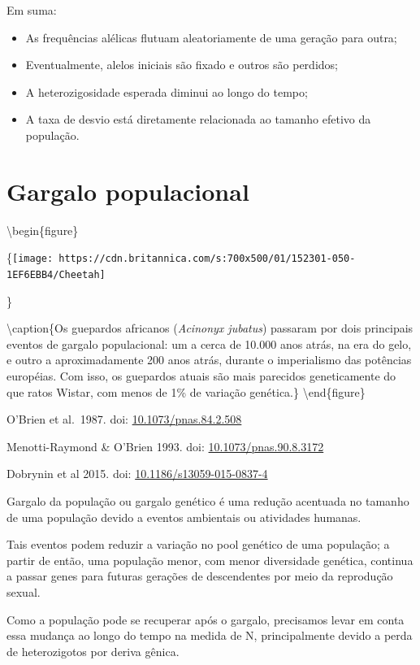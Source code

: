 \documentclass[
]{book}
\begin{document}
Em suma:

\begin{itemize}
\item
  As frequências alélicas flutuam aleatoriamente de uma geração para outra;
\item
  Eventualmente, alelos iniciais são fixado e outros são perdidos;
\item
  A heterozigosidade esperada diminui ao longo do tempo;
\item
  A taxa de desvio está diretamente relacionada ao tamanho efetivo da população.
\end{itemize}

\hypertarget{gargalo-populacional}{%
\section{Gargalo populacional}\label{gargalo-populacional}}

\textbackslash begin\{figure\}

\{\centering \texttt{[image: https://cdn.britannica.com/s:700x500/01/152301-050-1EF6EBB4/Cheetah]}

\}

\textbackslash caption\{Os guepardos africanos (\emph{Acinonyx jubatus}) passaram por dois principais eventos de gargalo populacional: um a cerca de 10.000 anos atrás, na era do gelo, e outro a aproximadamente 200 anos atrás, durante o imperialismo das potências européias. Com isso, os guepardos atuais são mais parecidos geneticamente do que ratos Wistar, com menos de 1\% de variação genética.\}\label{fig:cheetah}
\textbackslash end\{figure\}

O'Brien et al.~1987. doi: \href{https://doi.org/10.1073/pnas.84.2.508}{10.1073/pnas.84.2.508}

Menotti-Raymond \& O'Brien 1993. doi: \href{https://doi.org/10.1073/pnas.90.8.3172}{10.1073/pnas.90.8.3172}

Dobrynin et al 2015. doi: \href{https://doi.org/10.1186/s13059-015-0837-4}{10.1186/s13059-015-0837-4}

Gargalo da população ou gargalo genético é uma redução acentuada no tamanho de uma população devido a eventos ambientais ou atividades humanas.

Tais eventos podem reduzir a variação no pool genético de uma população; a partir de então, uma população menor, com menor diversidade genética, continua a passar genes para futuras gerações de descendentes por meio da reprodução sexual.

Como a população pode se recuperar após o gargalo, precisamos levar em conta essa mudança ao longo do tempo na medida de N, principalmente devido a perda de heterozigotos por deriva gênica.
\end{document}
